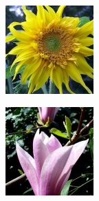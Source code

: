 \documentclass{report}
\begin{document}
\begin{figure}[h!]
  \hfill
  \begin{subfigure}[t]{0.19\textwidth}
    \centering
    \includegraphics[width=\textwidth]{dataset/flower_0.jpg}
    \label{fig:dataset-sub1}
  \end{subfigure}
  \hfill
  \begin{subfigure}[t]{0.19\textwidth}
    \centering
    \includegraphics[width=\textwidth]{dataset/flower_1.jpg}

\end{subfigure}
\end{figure}
\end{document}
